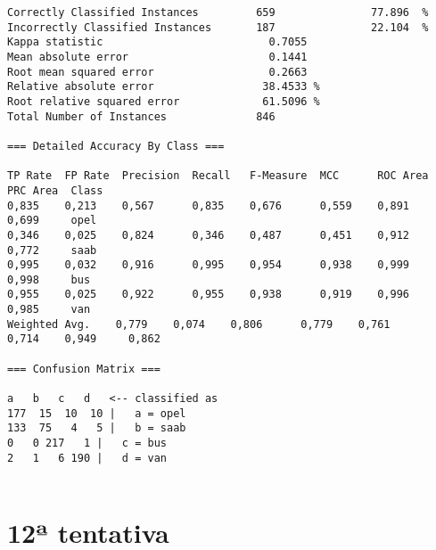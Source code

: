 \documentclass[
	article,			%
	11pt,				%
	oneside,			%
	a4paper,			%
	english,			%
	brazil,				%
	sumario=tradicional
	]{abntex2}
\begin{document}
\begin{lstlisting}
Correctly Classified Instances         659               77.896  %
Incorrectly Classified Instances       187               22.104  %
Kappa statistic                          0.7055
Mean absolute error                      0.1441
Root mean squared error                  0.2663
Relative absolute error                 38.4533 %
Root relative squared error             61.5096 %
Total Number of Instances              846     

=== Detailed Accuracy By Class ===

TP Rate  FP Rate  Precision  Recall   F-Measure  MCC      ROC Area  PRC Area  Class
0,835    0,213    0,567      0,835    0,676      0,559    0,891     0,699     opel
0,346    0,025    0,824      0,346    0,487      0,451    0,912     0,772     saab
0,995    0,032    0,916      0,995    0,954      0,938    0,999     0,998     bus
0,955    0,025    0,922      0,955    0,938      0,919    0,996     0,985     van
Weighted Avg.    0,779    0,074    0,806      0,779    0,761      0,714    0,949     0,862     

=== Confusion Matrix ===

a   b   c   d   <-- classified as
177  15  10  10 |   a = opel
133  75   4   5 |   b = saab
0   0 217   1 |   c = bus
2   1   6 190 |   d = van


\end{lstlisting}

\section{12ª tentativa}
\end{document}

